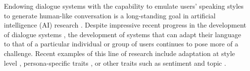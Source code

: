 

Endowing dialogue systems with the capability to emulate users' speaking styles to generate human-like conversation is a long-standing goal in artificial intelligence (AI) research \citep{edlund2008towards, scheutz2011toward}.
Despite impressive recent progress in the development of dialogue systems \citep{mctear2020conversational}, the development of systems that can adapt their language to that of a particular individual or group of users continues to pose more of a challenge.
Recent examples of this line of research include adaptation at style level \citep{ficler-goldberg-2017-controlling}, persona-specific traits \citep{zhang-etal-2018-personalizing}, or other traits such as sentiment and topic \citep{madotto-etal-2020-plug}.

